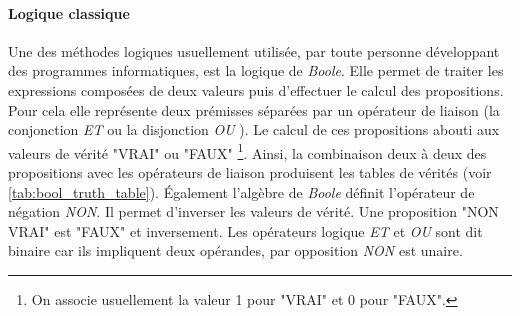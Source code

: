 \begin{refsegment}
    \paragraph{Logique classique}
    
    Une des méthodes logiques usuellement utilisée, par toute personne développant des programmes informatiques, est la logique de \textit{Boole}. Elle permet de traiter les expressions composées de deux valeurs puis d'effectuer le calcul des propositions. Pour cela elle représente deux prémisses séparées par un opérateur de liaison (la conjonction \textit{ET} ou la disjonction \textit{OU} ). Le calcul de ces propositions abouti aux valeurs de vérité "VRAI" ou "FAUX" \footnote{On associe usuellement la valeur 1 pour "VRAI" et 0 pour "FAUX".}. Ainsi, la combinaison deux à deux des propositions avec les opérateurs de liaison produisent les tables de vérités (voir \cref{tab:bool_truth_table}). Également l'algèbre de \textit{Boole} définit l'opérateur de négation \textit{NON}. Il permet d'inverser les valeurs de vérité. Une proposition "NON VRAI" est "FAUX" et inversement. Les opérateurs logique \textit{ET} et \textit{OU} sont dit binaire car ils impliquent deux opérandes, par opposition \textit{NON} est unaire.
    

\end{refsegment}
